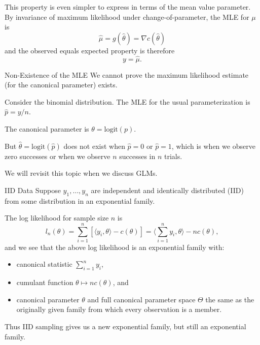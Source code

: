 \documentclass[
  ignorenonframetext,
]{beamer}
\providecommand{\tightlist}{%
  \setlength{\itemsep}{0pt}\setlength{\parskip}{0pt}}
\begin{document}
\begin{frame}{}
\protect\hypertarget{section-2}{}
This property is even simpler to express in terms of the mean value
parameter. By invariance of maximum likelihood under
change-of-parameter, the MLE for \(\mu\) is \[
  \hat\mu = g(\hat\theta) = \nabla c(\hat\theta)
\] and the observed equals expected property is therefore
\begin{equation} \label{obsequalsexp}
  y = \hat\mu.  
\end{equation}
\end{frame}

\begin{frame}{Non-Existence of the MLE}
\protect\hypertarget{non-existence-of-the-mle}{}
We cannot prove the maximum likelihood estimate (for the canonical
parameter) exists.

Consider the binomial distribution. The MLE for the usual
parameterization is \(\hat p = y/n\).

The canonical parameter is \(\theta = \text{logit}(p)\).

But \(\hat \theta = \text{logit}(\hat p)\) does not exist when
\(\hat p = 0\) or \(\hat p = 1\), which is when we observe zero
successes or when we observe \(n\) successes in \(n\) trials.

We will revisit this topic when we discuss GLMs.
\end{frame}

\begin{frame}{IID Data}
\protect\hypertarget{iid-data}{}
Suppose \(y_1, \ldots, y_n\) are independent and identically distributed
(IID) from some distribution in an exponential family.

The log likelihood for sample size \(n\) is \begin{equation} \label{iid}
    l_n(\theta) = \sum_{i=1}^n\left[\langle y_i,\theta\rangle - c(\theta)\right] 
      = \langle\sum_{i=1}^n y_i, \theta\rangle - n c(\theta),
\end{equation} and we see that the above log likelihood is an
exponential family with:

\begin{itemize}
\tightlist
\item
  canonical statistic \(\sum_{i=1}^n y_i\),
\item
  cumulant function \(\theta \mapsto n c(\theta)\), and
\item
  canonical parameter \(\theta\) and full canonical parameter space
  \(\Theta\) the same as the originally given family from which every
  observation is a member.
\end{itemize}

Thus IID sampling gives us a new exponential family, but still an
exponential family.
\end{frame}
\end{document}

